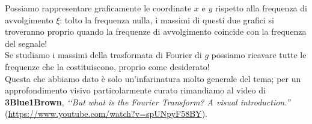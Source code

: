 Possiamo rappresentare graficamente le coordinate $x$ e $y$ rispetto alla frequenza di avvolgimento $\xi$: tolto la frequenza nulla, i massimi di questi due grafici si troveranno proprio quando la frequenze di avvolgimento coincide con la frequenza del segnale!\\
Se studiamo i massimi della trasformata di Fourier di $g$ possiamo ricavare tutte le frequenze che la costituiscono, proprio come desiderato!\\
Questa che abbiamo dato è solo un'infarinatura molto generale del tema; per un approfondimento visivo particolarmente curato rimandiamo al video di \textbf{3Blue1Brown}, 	\textit{‘‘But what is the Fourier Transform?  A visual introduction.''} (\textcolor{redill}{\url{https://www.youtube.com/watch?v=spUNpyF58BY}}).
